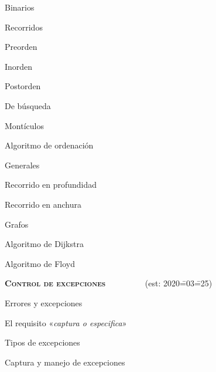 \begin{longenum}
\begin{longenum}
\begin{longenum}
            \item Binarios
            \begin{longenum}
                \item Recorridos
                \begin{longenum}
                    \item Preorden
                    \item Inorden
                    \item Postorden
                \end{longenum}
            \end{longenum}
            \item De búsqueda
            \item Montículos
            \begin{longenum}
                \item Algoritmo de ordenación
            \end{longenum}
            \item Generales
            \begin{longenum}
                \item Recorrido en profundidad
                \item Recorrido en anchura
            \end{longenum}
        \end{longenum}
        \item Grafos
        \begin{longenum}
            \item Algoritmo de Dijkstra
            \item Algoritmo de Floyd
        \end{longenum}
    \end{longenum}
    \item \textbf{\textsc{Control de excepciones}} \ \ \ \ \ \ \ \ \ (est: 2020\==03\==25)
    \begin{longenum}
        \item Errores y excepciones
        \item El requisito «\textit{captura o especifica}»
        \begin{longenum}
            \item Tipos de excepciones
        \end{longenum}
        \item Captura y manejo de excepciones
        \begin{longenum}

\end{longenum}
\end{longenum}
\end{longenum}
